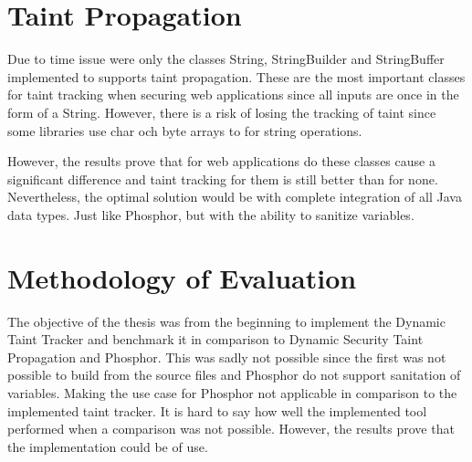 \section{Taint Propagation}
\label{propagation}
Due to time issue were only the classes String, StringBuilder and StringBuffer implemented to supports taint propagation. These are the most important classes for taint tracking when securing web applications since all inputs are once in the form of a String. However, there is a risk of losing the tracking of taint since some libraries use char och byte arrays to for string operations.

However, the results prove that for web applications do these classes cause a significant difference and taint tracking for them is still better than for none. Nevertheless, the optimal solution would be with complete integration of all Java data types. Just like Phosphor, but with the ability to sanitize variables.



\section{Methodology of Evaluation}
\label{methev}
The objective of the thesis was from the beginning to implement the Dynamic Taint Tracker and benchmark it in comparison to Dynamic Security Taint Propagation and Phosphor. This was sadly not possible since the first was not possible to build from the source files and Phosphor do not support sanitation of variables. Making the use case for Phosphor not applicable in comparison to the implemented taint tracker. It is hard to say how well the implemented tool performed when a comparison was not possible. However, the results prove that the implementation could be of use.